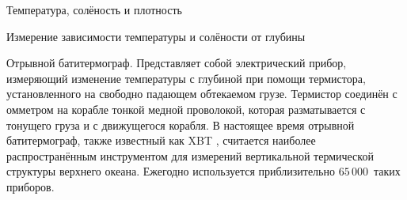 \begin{chapter}{Температура, солёность и плотность}
\begin{section}{Измерение зависимости температуры и солёности от глубины}
\begin{paragraph}{Отрывной батитермограф.} 
Представляет собой электрический прибор, измеряющий изменение температуры 
с глубиной при помощи термистора, установленного на свободно падающем 
обтекаемом грузе. Термистор соединён с омметром на корабле тонкой медной 
проволокой, которая разматывается с тонущего груза и с движущегося корабля. 
В настоящее время отрывной батитермограф, также известный как XBT%
, считается наиболее распространённым
инструментом для измерений вертикальной термической структуры верхнего
океана. Ежегодно используется приблизительно $65\,000$~таких приборов.
%


\end{paragraph}
\end{section}
\end{chapter}

